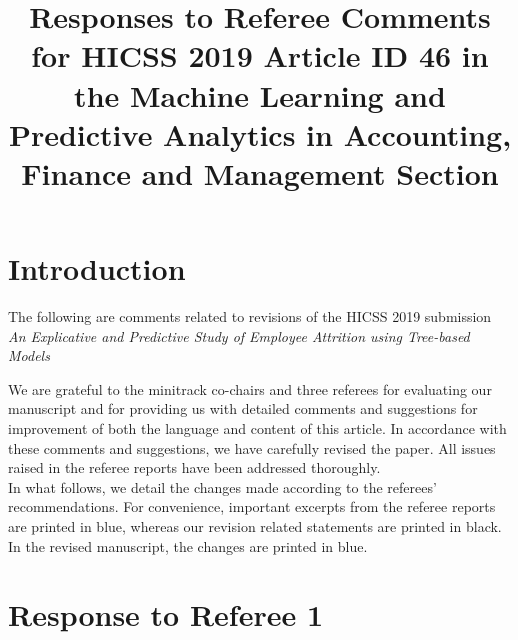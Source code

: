 \documentclass{amsart}[12pt]
\title{Responses to Referee Comments for HICSS 2019 Article ID 46 in the Machine Learning and 
Predictive Analytics in Accounting, Finance and Management Section}
\begin{document}
\maketitle

\section{Introduction}

The following are comments related to revisions of the HICSS 2019 submission \emph{An 
Explicative and Predictive Study of Employee Attrition using Tree-based Models} 

\indent
We are grateful to the minitrack co-chairs and three referees for evaluating our
manuscript and for providing us with detailed comments and suggestions for improvement of both 
the language and content of this article. In
accordance with these comments and suggestions, we have carefully revised
the paper. All issues raised in the referee reports have been addressed thoroughly.\\
\indent In what follows, we detail the changes made according to the referees'
recommendations. For convenience, important excerpts from the referee reports are printed in blue,
whereas our revision related statements are
printed in black. In the revised manuscript, the changes are printed in blue.\\




\section{Response to Referee 1}
\end{document}
